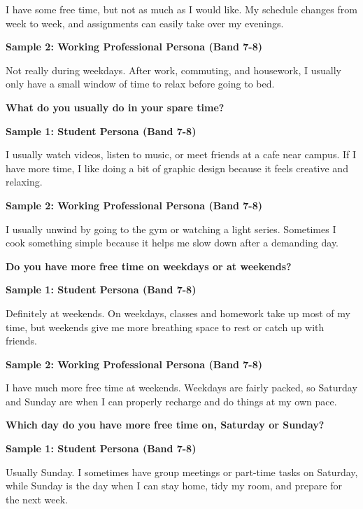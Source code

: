 I have some free time, but not as much as I would like. My schedule changes from week to week, and assignments can easily take over my evenings.

\textbf{Sample 2: Working Professional Persona (Band 7-8)}

Not really during weekdays. After work, commuting, and housework, I usually only have a small window of time to relax before going to bed.

\separator

\begin{ieltsquestion}
\textbf{What do you usually do in your spare time?}
\end{ieltsquestion}
\textbf{Sample 1: Student Persona (Band 7-8)}

I usually watch videos, listen to music, or meet friends at a cafe near campus. If I have more time, I like doing a bit of graphic design because it feels creative and relaxing.

\textbf{Sample 2: Working Professional Persona (Band 7-8)}

I usually unwind by going to the gym or watching a light series. Sometimes I cook something simple because it helps me slow down after a demanding day.

\separator

\begin{ieltsquestion}
\textbf{Do you have more free time on weekdays or at weekends?}
\end{ieltsquestion}
\textbf{Sample 1: Student Persona (Band 7-8)}

Definitely at weekends. On weekdays, classes and homework take up most of my time, but weekends give me more breathing space to rest or catch up with friends.

\textbf{Sample 2: Working Professional Persona (Band 7-8)}

I have much more free time at weekends. Weekdays are fairly packed, so Saturday and Sunday are when I can properly recharge and do things at my own pace.

\separator

\begin{ieltsquestion}
\textbf{Which day do you have more free time on, Saturday or Sunday?}
\end{ieltsquestion}
\textbf{Sample 1: Student Persona (Band 7-8)}

Usually Sunday. I sometimes have group meetings or part-time tasks on Saturday, while Sunday is the day when I can stay home, tidy my room, and prepare for the next week.

